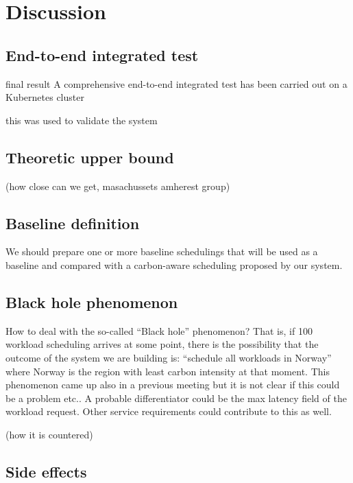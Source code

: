 \chapter{Discussion}
\label{cha:discussion}

\section{End-to-end integrated test}

final result
A comprehensive end-to-end integrated test has been carried out on a Kubernetes cluster

this was used to validate the system


\section{Theoretic upper bound}

 (how close can we get, masachussets amherest group)

\section{Baseline definition}

We should prepare one or more baseline schedulings that will be used as a baseline and compared with a carbon-aware scheduling proposed by our system.

\section{Black hole phenomenon}

How to deal with the so-called “Black hole” phenomenon?
That is, if 100 workload scheduling arrives at some point, there is the possibility that the outcome of the system we are building is: “schedule all workloads in Norway” where Norway is the region with least carbon intensity at that moment.
This phenomenon came up also in a previous meeting but it is not clear if this could be a problem etc..
A probable differentiator could be the max latency field of the workload request. Other service requirements could contribute to this as well.


(how it is countered)

\section{Side effects}

